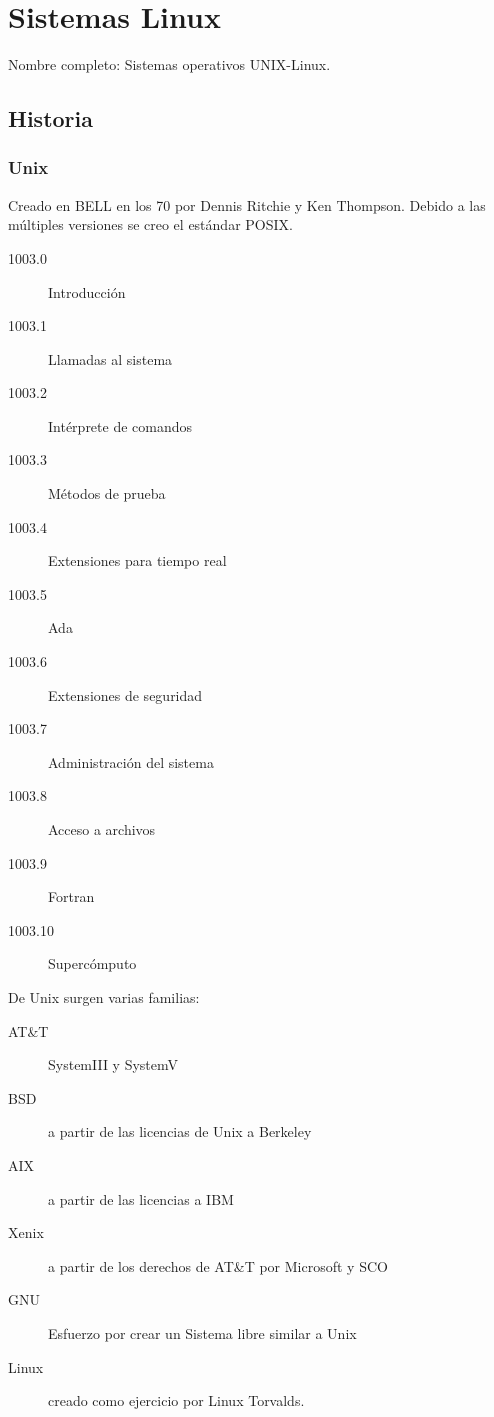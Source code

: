 \setcounter{section}{59} %
\section{Sistemas Linux}

Nombre completo: Sistemas operativos UNIX-Linux.

\localtableofcontents

\subsection{Historia}
    \subsubsection{Unix}
        Creado en BELL en los 70 por Dennis Ritchie y Ken Thompson. Debido a las múltiples versiones se creo el estándar POSIX.
        \begin{description}
            \item[1003.0] Introducción
            \item[1003.1] Llamadas al sistema
            \item[1003.2] Intérprete de comandos
            \item[1003.3] Métodos de prueba
            \item[1003.4] Extensiones para tiempo real
            \item[1003.5] Ada
            \item[1003.6] Extensiones de seguridad
            \item[1003.7] Administración del sistema
            \item[1003.8] Acceso a archivos
            \item[1003.9] Fortran
            \item[1003.10] Supercómputo
        \end{description}

        De Unix surgen varias familias:
        \begin{description}
            \item[AT\&T] SystemIII y SystemV
            \item[BSD] a partir de las licencias de Unix a Berkeley
            \item[AIX] a partir de las licencias a IBM
            \item[Xenix] a partir de los derechos de AT\&T por Microsoft y SCO
            \item[GNU] Esfuerzo por crear un Sistema libre similar a Unix
            \item[Linux] creado como ejercicio por Linux Torvalds.
        \end{description}

